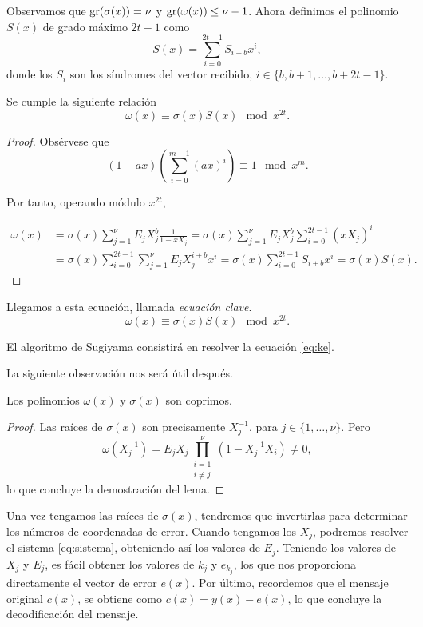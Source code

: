 Observamos que $\operatorname{gr}(\sigma(x)) = \nu$ y $\operatorname{gr}(\omega(x)) \leq \nu - 1$. Ahora definimos el polinomio $S(x)$ de grado máximo $2t - 1$ como $$S(x) = \sum_{i=0}^{2t-1}S_{i+b}x^i,$$ donde los $S_i$ son los síndromes del vector recibido, $i \in \{b,b+1,\dots,b + 2t - 1\}$. 

\begin{teorema} Se cumple la siguiente relación
  $$\omega(x) \equiv \sigma(x)S(x) \mod x^{2t}.$$
\end{teorema}

\begin{proof}
Obsérvese que $$(1 - ax)\left(\sum_{i=0}^{m-1}(ax)^i\right) \equiv 1 \mod x^m.$$

Por tanto, operando módulo $x^{2t}$,

\begin{align*}
  \omega(x) &= \sigma(x) \sum_{j=1}^{\nu}E_j X_j^b \frac{1}{1 - x X_j} = \sigma(x)\sum_{j=1}^{\nu} E_j X_j^b\sum_{i=0}^{2t - 1}(xX_j)^i \\
  &= \sigma(x)\sum_{i=0}^{2t - 1}\sum_{j=1}^{\nu} E_j X_j^{i+b}x^i = \sigma(x) \sum_{i=0}^{2t-1}S_{i+b}x^i = \sigma(x)S(x).
\end{align*}


\end{proof}


Llegamos a esta ecuación, llamada \emph{ecuación clave}.
\begin{equation}\label{eq:ke}
  \omega(x) \equiv \sigma(x)S(x) \mod x^{2t}.
\end{equation}

El algoritmo de Sugiyama consistirá en resolver la ecuación \eqref{eq:ke}.

La siguiente observación nos será útil después.
\begin{lema}\label{lema:co}
Los polinomios $\omega(x)$ y $\sigma(x)$ son coprimos.
\end{lema}

\begin{proof} Las raíces de $\sigma(x)$ son precisamente $X_j^{-1}$, para $j \in \{1,\dots,\nu\}$. Pero
  $$\omega(X_j^{-1}) = E_jX_j\prod_{\substack{i=1 \\ i \neq j}}^{\nu} (1 - X_j^{-1} X_i) \neq 0,$$
  lo que concluye la demostración del lema.
\end{proof}

Una vez tengamos las raíces de $\sigma(x)$, tendremos que invertirlas para determinar los números de coordenadas de error. Cuando tengamos los $X_j$, podremos resolver el sistema \eqref{eq:sistema}, obteniendo así los valores de $E_j$. Teniendo los valores de $X_j$ y $E_j$, es fácil obtener los valores de $k_j$ y $e_{k_j}$,  los que nos proporciona directamente el vector de error $e(x)$. Por último, recordemos que el mensaje original $c(x)$, se obtiene como $c(x) = y(x) - e(x)$, lo que concluye la decodificación del mensaje.

